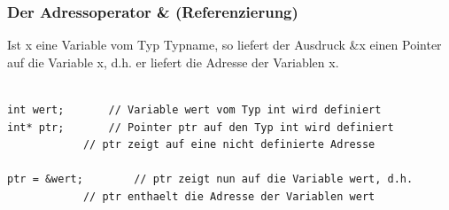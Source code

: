 \subsubsection{Der Adressoperator \& \textbf{(Referenzierung)}}
\label{sec:Der Adressoperator}
Ist x eine Variable vom Typ Typname, so liefert der Ausdruck \&x einen Pointer auf die Variable x, d.h. er liefert die Adresse der Variablen x.\\
\\
\noindent
\begin{minipage}{\linewidth}
\begin{lstlisting}
int wert;		// Variable wert vom Typ int wird definiert
int* ptr;		// Pointer ptr auf den Typ int wird definiert
			// ptr zeigt auf eine nicht definierte Adresse
		
ptr = &wert;		// ptr zeigt nun auf die Variable wert, d.h. 
			// ptr enthaelt die Adresse der Variablen wert
\end{lstlisting}
\end{minipage}

